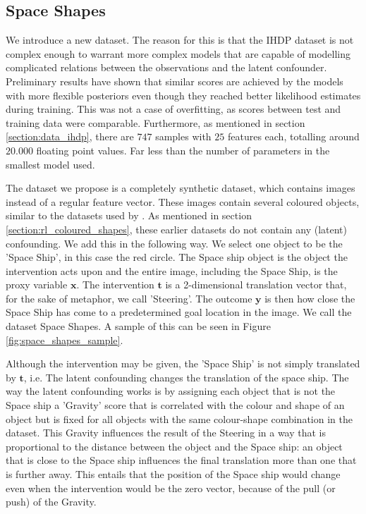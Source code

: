 \documentclass{report}
\newcommand{\bt}{\mathbf{t}}
\newcommand{\bx}{\mathbf{x}}
\newcommand{\by}{\mathbf{y}}
\begin{document}
\subsection{Space Shapes}\label{section:data_space}
We introduce a new dataset. The reason for this is that the IHDP dataset is not complex enough to warrant more complex models that are capable of modelling complicated relations between the observations and the latent confounder. Preliminary results have shown that similar scores are achieved by the models with more flexible posteriors even though they reached better likelihood estimates during training. This was not a case of overfitting, as scores between test and training data were comparable. Furthermore, as mentioned in section \ref{section:data_ihdp}, there are $747$ samples with $25$ features each, totalling around $20.000$ floating point values. Far less than the number of parameters in the smallest model used.

The dataset we propose is a completely synthetic dataset, which contains images instead of a regular feature vector. These images contain several coloured objects, similar to the datasets used by \textcite{kipf2019contrastive, kumar2019videoflow}. As mentioned in section \ref{section:rl_coloured_shapes}, these earlier datasets do not contain any (latent) confounding. We add this in the following way. We select one object to be the 'Space Ship', in this case the red circle. The Space ship object is the object the intervention acts upon and the entire image, including the Space Ship, is the proxy variable $\bx$. The intervention $\bt$ is a 2-dimensional translation vector that, for the sake of metaphor, we call 'Steering'. The outcome $\by$ is then how close the Space Ship has come to a predetermined goal location in the image. We call the dataset Space Shapes. A sample of this can be seen in Figure \ref{fig:space_shapes_sample}.

Although the intervention may be given, the 'Space Ship' is not simply translated by $\bt$, i.e. The latent confounding changes the translation of the space ship. The way the latent confounding works is by assigning each object that is not the Space ship a 'Gravity' score that is correlated with the colour and shape of an object but is fixed for all objects with the same colour-shape combination in the dataset. This Gravity influences the result of the Steering in a way that is proportional to the distance between the object and the Space ship: an object that is close to the Space ship influences the final translation more than one that is further away. This entails that the position of the Space ship would change even when the intervention would be the zero vector, because of the pull (or push) of the Gravity.
\end{document}
